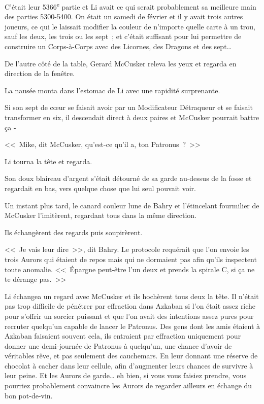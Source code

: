 C'était leur 5366\textsuperscript{e} partie et Li avait ce qui serait probablement sa meilleure main des parties 5300-5400. On était un samedi de février et il y avait trois autres joueurs, ce qui le laissait modifier la couleur de n'importe quelle carte à un trou, sauf les deux, les trois ou les sept~; et c'était suffisant pour lui permettre de construire un Corps-à-Corps avec des Licornes, des Dragons et des sept…

De l'autre côté de la table, Gerard McCusker releva les yeux et regarda en direction de la fenêtre.

La nausée monta dans l'estomac de Li avec une rapidité surprenante.

Si son sept de cœur se faisait avoir par un Modificateur Détraqueur et se faisait transformer en six, il descendait direct à deux paires et McCusker pourrait battre ça -

<<~Mike, dit McCusker, qu'est-ce qu'il a, ton Patronus~?~>>

Li tourna la tête et regarda.

Son doux blaireau d'argent s'était détourné de sa garde au-dessus de la fosse et regardait en bas, vers quelque chose que lui seul pouvait voir.

Un instant plus tard, le canard couleur lune de Bahry et l'étincelant fourmilier de McCusker l'imitèrent, regardant tous dans la même direction.

Ils échangèrent des regards puis soupirèrent.

<<~Je vais leur dire~>>, dit Bahry. Le protocole requérait que l'on envoie les trois Aurors qui étaient de repos mais qui ne dormaient pas afin qu'ils inspectent toute anomalie. <<~Épargne peut-être l'un deux et prends la spirale C, si ça ne te dérange pas.~>>

Li échangea un regard avec McCusker et ils hochèrent tous deux la tête. Il n'était pas trop difficile de pénétrer par effraction dans Azkaban si l'on était assez riche pour s'offrir un sorcier puissant et que l'on avait des intentions assez pures pour recruter quelqu'un capable de lancer le Patronus. Des gens dont les amis étaient à Azkaban faisaient souvent cela, ils entraient par effraction uniquement pour donner une demi-journée de Patronus à quelqu'un, une chance d'avoir de véritables rêve, et pas seulement des cauchemars. En leur donnant une réserve de chocolat à cacher dans leur cellule, afin d'augmenter leurs chances de survivre à leur peine. Et les Aurors de garde… eh bien, si vous vous faisiez prendre, vous pourriez probablement convaincre les Aurors de regarder ailleurs en échange du bon pot-de-vin.

